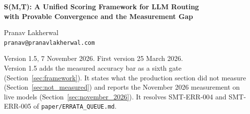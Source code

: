 \documentclass[11pt,a4paper]{article}
\begin{document}
\begin{center}
{\LARGE\bfseries S(M,T): A Unified Scoring Framework for LLM Routing\\[4pt]
with Provable Convergence and the Measurement Gap\par}

\vspace{14pt}

{\large Pranav Lakherwal}\\[4pt]
{\normalsize\texttt{pranav@pranavlakherwal.com}}

\vspace{10pt}

{\normalsize Version 1.5, 7 November 2026. First version 25 March 2026.}\\[4pt]
{\small Version 1.5 adds the measured accuracy bar as a sixth gate (Section~\ref{sec:framework}). It states what the production section did not measure (Section~\ref{sec:not_measured}) and reports the November 2026 measurement on live models (Section~\ref{sec:november_2026}). It resolves SMT-ERR-004 and SMT-ERR-005 of \texttt{paper/ERRATA\_QUEUE.md}.}
\end{center}

\vspace{10pt}
\end{document}
